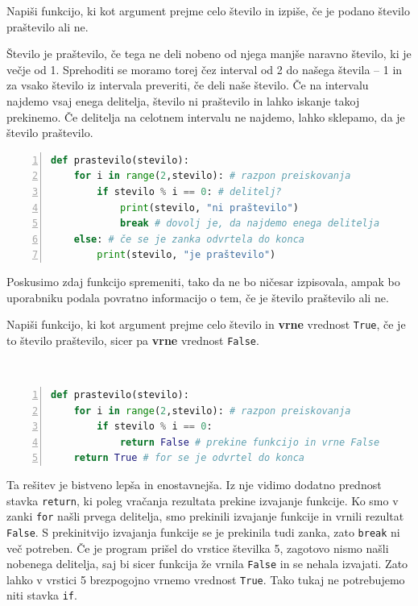 \begin{zgled}
Napiši funkcijo, ki kot argument prejme celo število in izpiše, če je podano število praštevilo ali ne.
\end{zgled}

\begin{resitev}
Število je praštevilo, če tega ne deli nobeno od njega manjše naravno število, ki je večje od 1. Sprehoditi se moramo torej čez interval od 2 do našega števila -- 1 in za vsako število iz intervala preveriti, če deli naše število. Če na intervalu najdemo vsaj enega delitelja, število ni praštevilo in lahko iskanje takoj prekinemo. Če delitelja na celotnem intervalu ne najdemo, lahko sklepamo, da je število praštevilo.
\begin{lstlisting}[language=Python,numbers=left]
def prastevilo(stevilo):
    for i in range(2,stevilo): # razpon preiskovanja
        if stevilo % i == 0: # delitelj?
            print(stevilo, "ni praštevilo")
            break # dovolj je, da najdemo enega delitelja
    else: # če se je zanka odvrtela do konca
        print(stevilo, "je praštevilo")   
\end{lstlisting}
\end{resitev}
Poskusimo zdaj funkcijo spremeniti, tako da ne bo ničesar izpisovala, ampak bo uporabniku podala povratno informacijo o tem, če je število praštevilo ali ne.
\begin{zgled}
Napiši funkcijo, ki kot argument prejme celo število in \textbf{vrne} vrednost \texttt{True}, če je to število praštevilo, sicer pa \textbf{vrne} vrednost \texttt{False}.
\end{zgled}
\begin{resitev} \  
\begin{lstlisting}[language=Python,numbers=left]
def prastevilo(stevilo):
    for i in range(2,stevilo): # razpon preiskovanja
        if stevilo % i == 0:
            return False # prekine funkcijo in vrne False
    return True # for se je odvrtel do konca
\end{lstlisting}
\end{resitev}
Ta rešitev je bistveno lepša in enostavnejša. Iz nje vidimo dodatno prednost stavka \texttt{return}, ki poleg vračanja rezultata prekine izvajanje funkcije. Ko smo v zanki \texttt{for} našli prvega delitelja, smo prekinili izvajanje funkcije in vrnili rezultat \texttt{False}. S prekinitvijo izvajanja funkcije se je prekinila tudi zanka, zato \texttt{break} ni več potreben. Če je program prišel do vrstice številka 5, zagotovo nismo našli nobenega delitelja, saj bi sicer funkcija že vrnila \texttt{False} in se nehala izvajati. Zato lahko v vrstici 5 brezpogojno vrnemo vrednost \texttt{True}. Tako tukaj ne potrebujemo niti stavka \texttt{if}.

